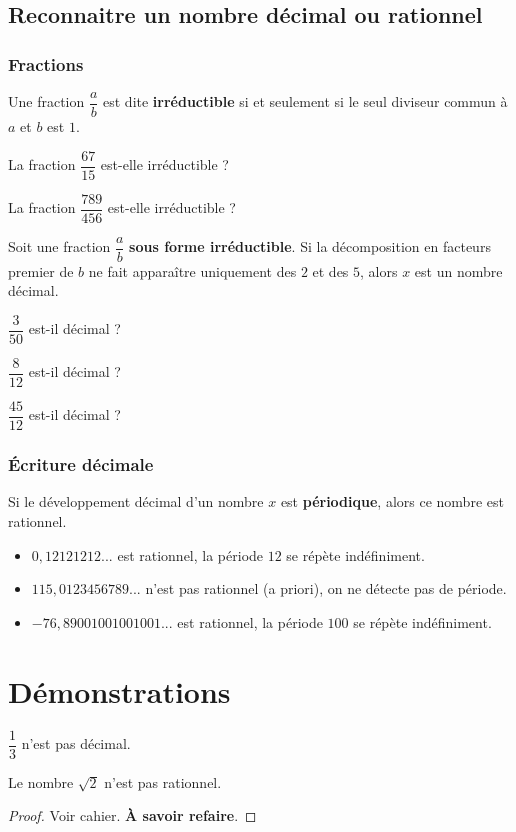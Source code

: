 \documentclass{poly}
\begin{document}
\subsection{Reconnaitre un nombre décimal ou rationnel}
\subsubsection{Fractions}
\begin{definition}
Une fraction $\dfrac{a}{b}$ est dite \textbf{irréductible} si et seulement si le seul diviseur commun à $a$ et $b$ est $1$. 
\end{definition}
\begin{example}
\hfill
\begin{alphaquestions}
\item La fraction $\dfrac{67}{15}$ est-elle irréductible ? 
\item La fraction $\dfrac{789}{456}$ est-elle irréductible ? 
\end{alphaquestions}
\end{example}
\begin{proposition}
Soit une fraction $\dfrac{a}{b}$ \textbf{sous forme irréductible}. Si la décomposition en facteurs premier de $b$ ne fait apparaître uniquement des $2$ et des $5$, alors $x$ est un nombre décimal.
\end{proposition}
\begin{example}
\hfill
\begin{alphaquestions}
\item $\dfrac{3}{50}$ est-il décimal ? 
\item $\dfrac{8}{12}$ est-il décimal ? 
\item $\dfrac{45}{12}$ est-il décimal ? 
\end{alphaquestions}
\end{example}
\subsubsection{Écriture décimale}
\begin{remark}
Si le développement décimal d'un nombre $x$ est \textbf{périodique}, alors ce nombre est rationnel.
\end{remark}
\begin{example}
\hfill
\begin{itemize}
\item $0,12121212...$ est rationnel, la période $12$ se répète indéfiniment.
\item $115,0123456789...$ n'est pas rationnel (a priori), on ne détecte pas de période.
\item $-76,89001001001001...$ est rationnel, la période $100$ se répète indéfiniment.
\end{itemize}
\end{example}
\section{Démonstrations}

\begin{proposition}
$\dfrac{1}{3}$ n'est pas décimal.
\end{proposition}

\begin{theorem}
Le nombre $\sqrt{2}$ n'est pas rationnel.
\end{theorem}
\begin{proof}
Voir cahier. \textbf{À savoir refaire}.
\end{proof}
\end{document}
